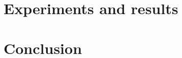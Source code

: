 \documentclass[10pt]{article}
\begin{document}
\section{Experiments and results}\label{experiments}
%

\section{Conclusion}\label{conclusion}
%

%



 \pagebreak

  
 
 \pagebreak
 \appendix
\end{document}
